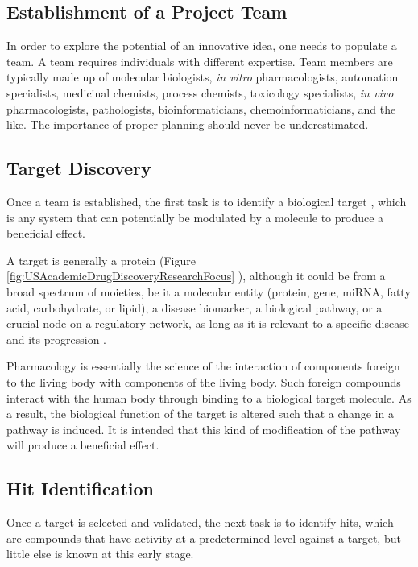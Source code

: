 \subsection{Establishment of a Project Team}

In order to explore the potential of an innovative idea, one needs to populate a team. A team requires individuals with different expertise. Team members are typically made up of molecular biologists, \textit{in vitro} pharmacologists, automation specialists, medicinal chemists, process chemists, toxicology specialists, \textit{in vivo} pharmacologists, pathologists, bioinformaticians, chemoinformaticians, and the like. The importance of proper planning should never be underestimated.

\subsection{Target Discovery}

Once a team is established, the first task is to identify a biological target \citep{706,355,356,357,797}, which is any system that can potentially be modulated by a molecule to produce a beneficial effect.

A target is generally a protein (Figure \ref{fig:USAcademicDrugDiscoveryResearchFocus} \citep{721}), although it could be from a broad spectrum of moieties, be it a molecular entity (protein, gene, miRNA, fatty acid, carbohydrate, or lipid), a disease biomarker, a biological pathway, or a crucial node on a regulatory network, as long as it is relevant to a specific disease and its progression \citep{711}.

Pharmacology is essentially the science of the interaction of components foreign to the living body with components of the living body. Such foreign compounds interact with the human body through binding to a biological target molecule. As a result, the biological function of the target is altered such that a change in a pathway is induced. It is intended that this kind of modification of the pathway will produce a beneficial effect.

\subsection{Hit Identification}

Once a target is selected and validated, the next task is to identify hits, which are compounds that have activity at a predetermined level against a target, but little else is known at this early stage.

